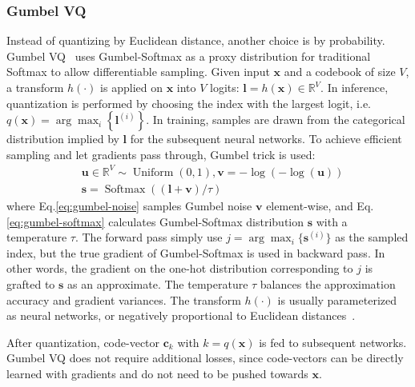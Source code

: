 \subsubsection{Gumbel VQ}
Instead of quantizing by Euclidean distance, another choice is by probability. 
Gumbel VQ~\cite{jang2017categorical} uses Gumbel-Softmax as a proxy distribution for traditional Softmax to allow differentiable sampling.
Given input $\bm x$ and a codebook of size $V$, a transform $h(\cdot)$ is applied on $\bm x$ into $V$ logits: $\bm l=h(\bm x)\in \mathbb R^V$.
In inference, quantization is performed by choosing the index with the largest logit, i.e. $q(\bm x)=\arg\max_i \left\{\bm l^{(i)}\right\}$.
In training, samples are drawn from the categorical distribution implied by $\bm l$ for the subsequent neural networks.
To achieve efficient sampling and let gradients pass through, Gumbel trick is used:
\begin{align}
    &\bm u\in \mathbb R^V\sim \operatorname{Uniform}(0, 1),\bm v=-\log(-\log(\bm u)) \label{eq:gumbel-noise} \\
    &\bm s=\operatorname{Softmax}((\bm l+\bm v)/\tau) \label{eq:gumbel-softmax}
\end{align}
where Eq.\eqref{eq:gumbel-noise} samples Gumbel noise $\bm v$ element-wise, and Eq.\eqref{eq:gumbel-softmax} calculates Gumbel-Softmax distribution $\bm s$ with a temperature $\tau$.
The forward pass simply use $j=\arg\max_i \{\bm s^{(i)}\}$ as the sampled index, but the true gradient of Gumbel-Softmax is used in backward pass.
In other words, the gradient on the one-hot distribution corresponding to $j$ is grafted to $\bm s$ as an approximate.
The temperature $\tau$ balances the approximation accuracy and gradient variances.
The transform $h(\cdot)$ is usually parameterized as neural networks, or negatively proportional to Euclidean distances~\cite{jiang2023latent}.

After quantization, code-vector $\bm c_k$ with $k=q(\bm x)$ is fed to subsequent networks.
Gumbel VQ does not require additional losses, since code-vectors can be directly learned with gradients and do not need to be pushed towards $\bm x$.

